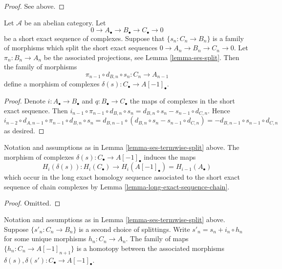 \begin{proof}
See above.
\end{proof}

\begin{lemma}
\label{lemma-ses-termwise-split}
Let $\mathcal{A}$ be an abelian category.
Let
$$
0 \to A_\bullet \to B_\bullet \to C_\bullet \to 0
$$
be a short exact sequence of complexes.
Suppose that $\{s_n : C_n \to B_n\}$ is a family
of morphisms which split the short exact sequences
$0 \to A_n \to B_n \to C_n \to 0$. Let
$\pi_n : B_n \to A_n$ be the associated
projections, see Lemma \ref{lemma-ses-split}.
Then the family of morphisms
$$
\pi_{n - 1} \circ d_{B, n} \circ s_n
:
C_n \to A_{n - 1}
$$
define a morphism of complexes $\delta(s) : C_\bullet \to A[-1]_\bullet$.
\end{lemma}

\begin{proof}
Denote $i : A_\bullet \to B_\bullet$ and $q : B_\bullet \to C_\bullet$
the maps of complexes in the short exact sequence. Then
$i_{n - 1} \circ \pi_{n - 1} \circ d_{B, n} \circ s_n =
d_{B, n} \circ s_n - s_{n - 1} \circ d_{C, n}$. Hence
$i_{n - 2} \circ d_{A, n - 1} \circ \pi_{n - 1} \circ d_{B, n} \circ s_n =
d_{B, n - 1} \circ (d_{B, n} \circ s_n - s_{n - 1} \circ d_{C, n}) =
- d_{B, n - 1} \circ s_{n - 1} \circ d_{C, n}$ as desired.
\end{proof}

\begin{lemma}
\label{lemma-ses-termwise-split-long}
Notation and assumptions as in Lemma \ref{lemma-ses-termwise-split} above.
The morphism of complexes $\delta(s) : C_\bullet \to A[-1]_\bullet$
induces the maps
$$
H_i(\delta(s)) :
H_i(C_\bullet) \longrightarrow H_i(A[-1]_\bullet) = H_{i - 1}(A_\bullet)
$$
which occur in the long exact homology sequence associated
to the short exact sequence of chain complexes by
Lemma \ref{lemma-long-exact-sequence-chain}.
\end{lemma}

\begin{proof}
Omitted.
\end{proof}

\begin{lemma}
\label{lemma-ses-termwise-split-homotopy}
Notation and assumptions as in Lemma \ref{lemma-ses-termwise-split} above.
Suppose $\{s'_n : C_n \to B_n\}$ is a second choice of splittings.
Write $s'_n = s_n + i_n \circ h_n$ for some unique
morphisms $h_n : C_n \to A_n$. The family of maps
$\{h_n : C_n \to A[-1]_{n + 1}\}$ is a homotopy between
the associated morphisms
$\delta(s), \delta(s') : C_\bullet \to A[-1]_\bullet$.
\end{lemma}

